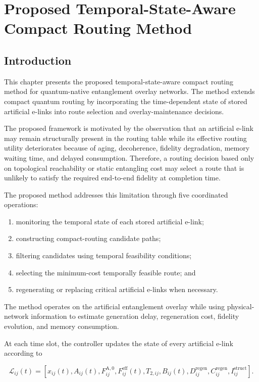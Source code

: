 \chapter{Proposed Temporal-State-Aware Compact Routing Method}

\section{Introduction}

This chapter presents the proposed temporal-state-aware compact routing method for quantum-native entanglement overlay networks. The method extends compact quantum routing by incorporating the time-dependent state of stored artificial e-links into route selection and overlay-maintenance decisions.

The proposed framework is motivated by the observation that an artificial e-link may remain structurally present in the routing table while its effective routing utility deteriorates because of aging, decoherence, fidelity degradation, memory waiting time, and delayed consumption. Therefore, a routing decision based only on topological reachability or static entangling cost may select a route that is unlikely to satisfy the required end-to-end fidelity at completion time.

The proposed method addresses this limitation through five coordinated operations:

\begin{enumerate}
    \item monitoring the temporal state of each stored artificial e-link;
    \item constructing compact-routing candidate paths;
    \item filtering candidates using temporal feasibility conditions;
    \item selecting the minimum-cost temporally feasible route; and
    \item regenerating or replacing critical artificial e-links when necessary.
\end{enumerate}

The method operates on the artificial entanglement overlay while using physical-network information to estimate generation delay, regeneration cost, fidelity evolution, and memory consumption.

At each time slot, the controller updates the state of every artificial e-link according to

\begin{equation}
    \mathcal{L}_{ij}(t)
    =
    \left[
    x_{ij}(t),
    A_{ij}(t),
    F_{ij}^{\mathrm{A},0},
    F_{ij}^{\mathrm{eff}}(t),
    T_{2,ij},
    B_{ij}(t),
    D_{ij}^{\mathrm{regen}},
    C_{ij}^{\mathrm{regen}},
    I_{ij}^{\mathrm{struct}}
    \right].
\end{equation}


